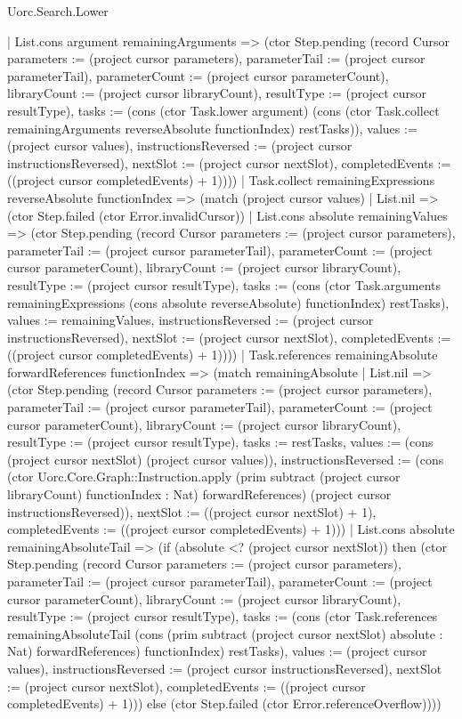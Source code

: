 \begin{lexlean}{Uorc.Search.Lower}
\begin{semanticmodule}
{          | List.cons argument remainingArguments => (ctor Step.pending (record Cursor {parameters := (project cursor parameters), parameterTail := (project cursor parameterTail), parameterCount := (project cursor parameterCount), libraryCount := (project cursor libraryCount), resultType := (project cursor resultType), tasks := (cons (ctor Task.lower argument) (cons (ctor Task.collect remainingArguments reverseAbsolute functionIndex) restTasks)), values := (project cursor values), instructionsReversed := (project cursor instructionsReversed), nextSlot := (project cursor nextSlot), completedEvents := ((project cursor completedEvents) + 1)})))
        | Task.collect remainingExpressions reverseAbsolute functionIndex => (match (project cursor values)
          | List.nil => (ctor Step.failed (ctor Error.invalidCursor))
          | List.cons absolute remainingValues => (ctor Step.pending (record Cursor {parameters := (project cursor parameters), parameterTail := (project cursor parameterTail), parameterCount := (project cursor parameterCount), libraryCount := (project cursor libraryCount), resultType := (project cursor resultType), tasks := (cons (ctor Task.arguments remainingExpressions (cons absolute reverseAbsolute) functionIndex) restTasks), values := remainingValues, instructionsReversed := (project cursor instructionsReversed), nextSlot := (project cursor nextSlot), completedEvents := ((project cursor completedEvents) + 1)})))
        | Task.references remainingAbsolute forwardReferences functionIndex => (match remainingAbsolute
          | List.nil => (ctor Step.pending (record Cursor {parameters := (project cursor parameters), parameterTail := (project cursor parameterTail), parameterCount := (project cursor parameterCount), libraryCount := (project cursor libraryCount), resultType := (project cursor resultType), tasks := restTasks, values := (cons (project cursor nextSlot) (project cursor values)), instructionsReversed := (cons (ctor Uorc.Core.Graph::Instruction.apply (prim subtract (project cursor libraryCount) functionIndex : Nat) forwardReferences) (project cursor instructionsReversed)), nextSlot := ((project cursor nextSlot) + 1), completedEvents := ((project cursor completedEvents) + 1)}))
          | List.cons absolute remainingAbsoluteTail => (if (absolute <? (project cursor nextSlot)) then (ctor Step.pending (record Cursor {parameters := (project cursor parameters), parameterTail := (project cursor parameterTail), parameterCount := (project cursor parameterCount), libraryCount := (project cursor libraryCount), resultType := (project cursor resultType), tasks := (cons (ctor Task.references remainingAbsoluteTail (cons (prim subtract (project cursor nextSlot) absolute : Nat) forwardReferences) functionIndex) restTasks), values := (project cursor values), instructionsReversed := (project cursor instructionsReversed), nextSlot := (project cursor nextSlot), completedEvents := ((project cursor completedEvents) + 1)})) else (ctor Step.failed (ctor Error.referenceOverflow))))
}
\end{semanticmodule}
\end{lexlean}

